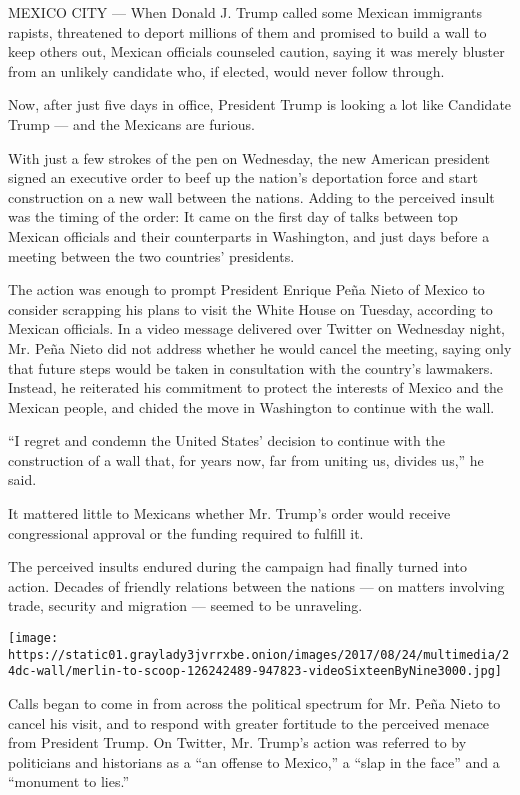 MEXICO CITY --- When Donald J. Trump called some Mexican immigrants
rapists, threatened to deport millions of them and promised to build a
wall to keep others out, Mexican officials counseled caution, saying it
was merely bluster from an unlikely candidate who, if elected, would
never follow through.

Now, after just five days in office, President Trump is looking a lot
like Candidate Trump --- and the Mexicans are furious.

With just a few strokes of the pen on Wednesday, the new American
president signed an executive order to beef up the nation's deportation
force and start construction on a new wall between the nations. Adding
to the perceived insult was the timing of the order: It came on the
first day of talks between top Mexican officials and their counterparts
in Washington, and just days before a meeting between the two countries'
presidents.

The action was enough to prompt President Enrique Peña Nieto of Mexico
to consider scrapping his plans to visit the White House on Tuesday,
according to Mexican officials. In a video message delivered over
Twitter on Wednesday night, Mr. Peña Nieto did not address whether he
would cancel the meeting, saying only that future steps would be taken
in consultation with the country's lawmakers. Instead, he reiterated his
commitment to protect the interests of Mexico and the Mexican people,
and chided the move in Washington to continue with the wall.

``I regret and condemn the United States' decision to continue with the
construction of a wall that, for years now, far from uniting us, divides
us,'' he said.

It mattered little to Mexicans whether Mr. Trump's order would receive
congressional approval or the funding required to fulfill it.

The perceived insults endured during the campaign had finally turned
into action. Decades of friendly relations between the nations --- on
matters involving trade, security and migration --- seemed to be
unraveling.

\texttt{[image: https://static01.graylady3jvrrxbe.onion/images/2017/08/24/multimedia/24dc-wall/merlin-to-scoop-126242489-947823-videoSixteenByNine3000.jpg]}

Calls began to come in from across the political spectrum for Mr. Peña
Nieto to cancel his visit, and to respond with greater fortitude to the
perceived menace from President Trump. On Twitter, Mr. Trump's action
was referred to by politicians and historians as a ``an offense to
Mexico,'' a ``slap in the face'' and a ``monument to lies.''

